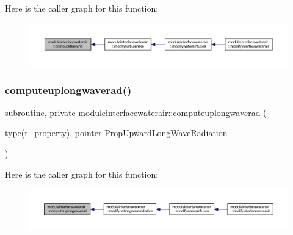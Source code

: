 Here is the caller graph for this function\+:\nopagebreak
\begin{figure}[H]
\begin{center}
\leavevmode
\includegraphics[width=350pt]{namespacemoduleinterfacewaterair_afa753f72a101e83d20369a3801986adb_icgraph}
\end{center}
\end{figure}
\mbox{\label{namespacemoduleinterfacewaterair_a6cfc460eb2c0c3821a172285fe7ae066}} 
\subsubsection{\texorpdfstring{computeuplongwaverad()}{computeuplongwaverad()}}
{\footnotesize\ttfamily subroutine, private moduleinterfacewaterair\+::computeuplongwaverad (\begin{DoxyParamCaption}\item[{type(\mbox{\hyperlink{structmoduleinterfacewaterair_1_1t__property}{t\+\_\+property}}), pointer}]{Prop\+Upward\+Long\+Wave\+Radiation }\end{DoxyParamCaption})\hspace{0.3cm}{\ttfamily [private]}}

Here is the caller graph for this function\+:\nopagebreak
\begin{figure}[H]
\begin{center}
\leavevmode
\includegraphics[width=350pt]{namespacemoduleinterfacewaterair_a6cfc460eb2c0c3821a172285fe7ae066_icgraph}
\end{center}
\end{figure}
\mbox{\label{namespacemoduleinterfacewaterair_a4dbe6db87de8afe751f851ce37f72dda}} 
